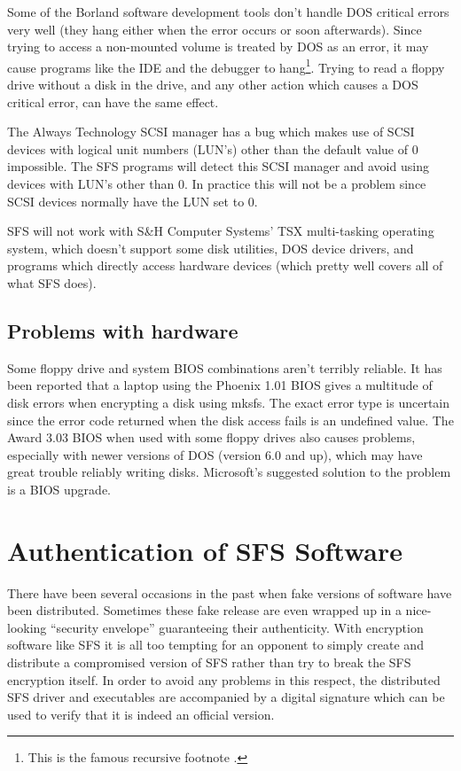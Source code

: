 Some of the Borland software development tools don't handle DOS critical errors
very well (they hang either when the error occurs or soon afterwards).  Since
trying to access a non-mounted volume is treated by DOS as an error, it may
cause programs like the IDE and the debugger to hang\footnote{
               This is the famous recursive footnote \thefootnote.
}.  Trying to read a 
floppy drive without a disk in the drive, and any other action which causes a 
DOS critical error, can have the same effect.

The Always Technology SCSI manager has a bug which makes use of SCSI devices
with logical unit numbers (LUN's) other than the default value of 0 impossible.
The SFS programs will detect this SCSI manager and avoid using devices with
LUN's other than 0.  In practice this will not be a problem since SCSI devices
normally have the LUN set to 0.

SFS will not work with S\&H Computer Systems' TSX multi-tasking operating
system, which doesn't support some disk utilities, DOS device drivers, and
programs which directly access hardware devices (which pretty well covers all
of what SFS does).


\subsection{Problems with hardware}

Some floppy drive and system BIOS combinations aren't terribly reliable.  It
has been reported that a laptop using the Phoenix 1.01 BIOS gives a multitude
of disk errors when encrypting a disk using mksfs.  The exact error type is
uncertain since the error code returned when the disk access fails is an
undefined value.  The Award 3.03 BIOS when used with some floppy drives also
causes problems, especially with newer versions of DOS (version 6.0 and up),
which may have great trouble reliably writing disks.  Microsoft's suggested
solution to the problem is a BIOS upgrade.


\section{Authentication of SFS Software}

There have been several occasions in the past when fake versions of software
have been distributed.  Sometimes these fake release are even wrapped up in a
nice-looking ``security envelope'' guaranteeing their authenticity.  With
encryption software like SFS it is all too tempting for an opponent to simply
create and distribute a compromised version of SFS rather than try to break the
SFS encryption itself.  In order to avoid any problems in this respect, the
distributed SFS driver and executables are accompanied by a digital signature
which can be used to verify that it is indeed an official version.


